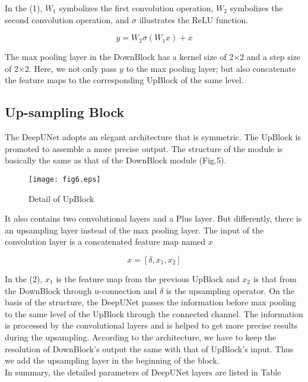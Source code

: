 \documentclass[conference]{IEEEtran}
\begin{document}
In the (1), $W_{1}$ symbolizes the first convolution operation, $W_{2}$ symbolizes the second convolution operation, and $\sigma$ illustrates the ReLU function.

\begin{equation}
y=W_{2}\sigma(W_{1}x)+x
\end{equation}

The max pooling layer in the DownBlock has a kernel size of 2$\times$2 and a step size of 2$\times$2. Here, we not only pass $y$ to the max pooling layer; but also concatenate the feature maps to the corresponding UpBlock of the same level.

\subsection{Up-sampling Block}
The DeepUNet adopts an elegant architecture that is symmetric. The UpBlock is promoted to assemble a more precise output. The structure of the module is basically the same as that of the DownBlock module (Fig.5).

\begin{figure}[htbp]
\setlength{\abovecaptionskip}{0pt}
\setlength{\belowcaptionskip}{-10pt}
\centering
\texttt{[image: fig6.eps]}
\caption{Detail of UpBlock}
\label{fig6}
\end{figure}

It also contains two convolutional layers and a Plus layer.  But differently, there is an upsampling layer instead of the max pooling layer. The input of the convolution layer is a concatenated feature map named $x$  

\begin{equation}
x=[\delta,x_{1},x_{2}]
\end{equation}

In the (2), $x_{1}$ is the feature map from the previous UpBlock and $x_{2}$ is that from the DownBlock through u-connection and $\delta$ is the upsampling operator. On the basis of the structure, the DeepUNet passes the information before max pooling to the same level of the UpBlock through the connected channel. The information is processed by the convolutional layers and is helped to get more precise results during the upsampling. According to the architecture, we have to keep the resolution of DownBlock’s output the same with that of UpBlock’s input. Thus we add the upsampling layer in the beginning of the block.\\

In summary, the detailed parameters of DeepUNet layers are listed in Table \uppercase\expandafter{}
\end{document}
